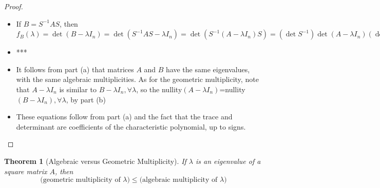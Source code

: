 \documentclass[10pt]{report}
\newtheorem{thm2}{Theorem}[section]
\begin{document}
\begin{proof}
\begin{itemize}
\item[a.] If $B=S^{-1}AS$, then $f_B(\lambda)=\det(B-\lambda I_n) = \det(S^{-1}AS-\lambda I_n) = \det(S^{-1}(A-\lambda I_n)S) = (\det S^{-1})\det(A-\lambda I_n)(\det S) = (\det S^{-1})(\det S)\det(A-\lambda I_n) = \det(A-\lambda I_n) = f_A(\lambda), \forall \lambda.$
\item[b.] ***
\item[c.] It follows from part (a) that matrices $A$ and $B$ have the same eigenvalues, with the same algebraic multiplicities. As for the geometric multiplicity, note that $A-\lambda I_n$ is similar to $B-\lambda I_n,\forall \lambda$, so the nullity$(A-\lambda I_n)$=nullity$(B-\lambda I_n),\forall \lambda$, by part (b)
\item[d.] These equations follow from part (a) and the fact that the trace and determinant are coefficients of the characteristic polynomial, up to signs.
\end{itemize}
\end{proof}
\begin{thm2}[Algebraic versus Geometric Multiplicity]
If $\lambda$ is an eigenvalue of a square matrix $A$, then
$$\text{(geometric multiplicity of }\lambda ) \leq \text{(algebraic multiplicity of } \lambda)$$
\end{thm2}
\end{document}
